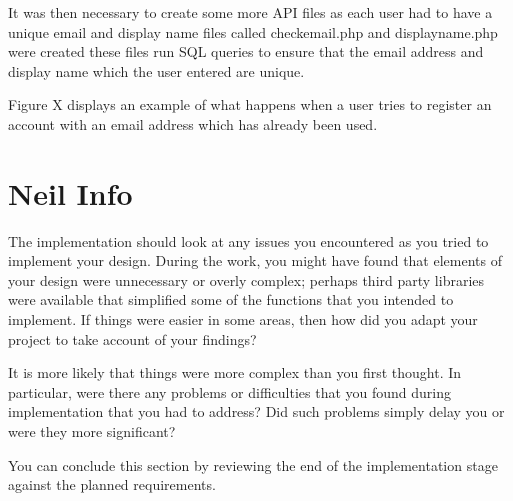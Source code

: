It was then necessary to create some more API files as each user had to have a unique email and display name files called checkemail.php and displayname.php were created these files run SQL queries to ensure that the email address and display name which the user entered are unique.

Figure X displays an example of what happens when a user tries to register an account with an email address which has already been used.



\section{Neil Info}

The implementation should look at any issues you encountered as you tried to implement your design. During the work, you might have found that elements of your design were unnecessary or overly complex; perhaps third party libraries were available that simplified some of the functions that you intended to implement. If things were easier in some areas, then how did you adapt your project to take account of your findings?

It is more likely that things were more complex than you first thought. In particular, were there any problems or difficulties that you found during implementation that you had to address? Did such problems simply delay you or were they more significant? 

You can conclude this section by reviewing the end of the implementation stage against the planned requirements. 
